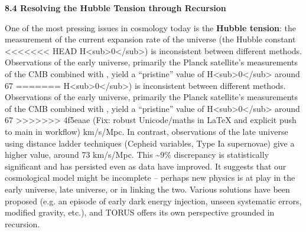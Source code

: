 \documentclass[]{article}
\begin{document}
\textbf{8.4 Resolving the Hubble Tension through Recursion}

One of the most pressing issues in cosmology today is the \textbf{Hubble
tension}: the measurement of the current expansion rate of the universe
(the Hubble constant
<<<<<<< HEAD
H\textless sub\textgreater0\textless/sub\textgreater) is inconsistent
between different methods. Observations of the early universe, primarily
the Planck satellite's measurements of the CMB combined with , yield
a ``pristine'' value of
H\textless sub\textgreater0\textless/sub\textgreater{} around 67
=======
H\textless{}sub\textgreater{}0\textless{}/sub\textgreater{}) is
inconsistent between different methods. Observations of the early
universe, primarily the Planck satellite's measurements of the CMB
combined with , yield a ``pristine'' value of
H\textless{}sub\textgreater{}0\textless{}/sub\textgreater{} around 67
>>>>>>> 4f5eaae (Fix: robust Unicode/maths in LaTeX and explicit push to main in workflow)
km/s/Mpc. In contrast, observations of the late universe using distance
ladder techniques (Cepheid variables, Type Ia supernovae) give a higher
value, around 73 km/s/Mpc. This \textasciitilde{}9\% discrepancy is
statistically significant and has persisted even as data have improved.
It suggests that our cosmological model might be incomplete -- perhaps
new physics is at play in the early universe, late universe, or in
linking the two. Various solutions have been proposed (e.g. an episode
of early dark energy injection, unseen systematic errors, modified
gravity, etc.), and TORUS offers its own perspective grounded in
recursion.
\end{document}
